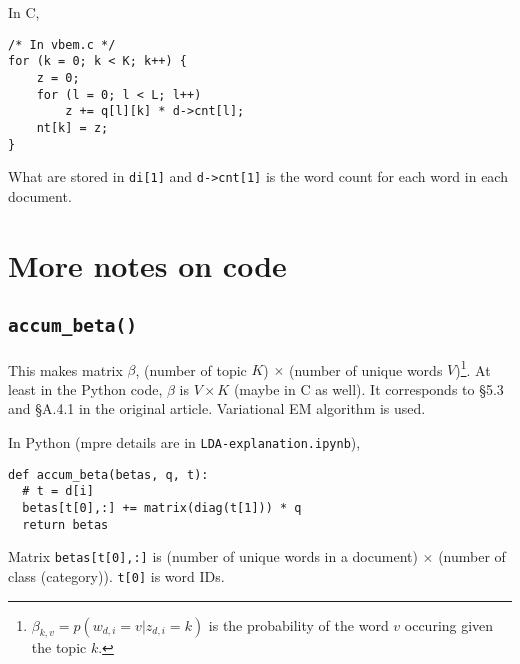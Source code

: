 \documentclass[a4paper,10.5pt,dvipdfmx]{jarticle}  %
\begin{document}
In C,
\begin{lstlisting}[style=C]
/* In vbem.c */
for (k = 0; k < K; k++) {
	z = 0;
	for (l = 0; l < L; l++)
		z += q[l][k] * d->cnt[l];
	nt[k] = z;
}
\end{lstlisting}

What are stored in \texttt{di[1]} and \texttt{d->cnt[1]} is the word count for each word in each document.

\section{More notes on code}
\subsection{\texttt{accum\_beta()}}
\noindent
This makes matrix $\beta$, (number of topic $K$) $\times$ (number of unique words $V$)\footnote[2]{$\beta_{k,v} = p(w_{d,i} = v|z_{d,i}=k)$ is the probability of the word $v$ occuring given the topic $k$.}. At least in the Python code, $\beta$ is $V \times K$ (maybe in C as well). It corresponds to \S5.3 and \S A.4.1 in the original article. Variational EM algorithm is used. \par
In Python (mpre details are in \texttt{LDA-explanation.ipynb}),
\begin{lstlisting}[style=Python]
def accum_beta(betas, q, t):
  # t = d[i]
  betas[t[0],:] += matrix(diag(t[1])) * q        
  return betas 
\end{lstlisting}
Matrix \texttt{betas[t[0],:]} is (number of unique words in a document) $\times$  (number of class (category)). \texttt{t[0]} is word IDs.
\end{document}
